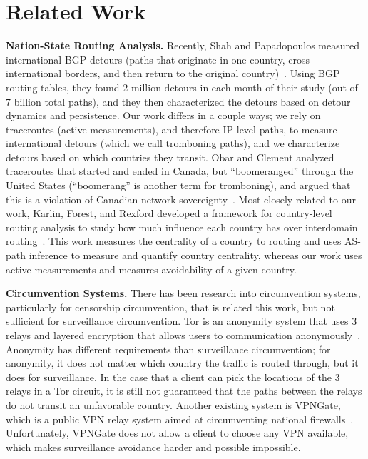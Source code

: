 \section{Related Work}
\label{related}

{\bf Nation-State Routing Analysis.}  Recently, Shah and Papadopoulos measured international BGP detours (paths that originate in one country, cross international borders, and then return to the original country)~\cite{shah2015characterizing}.  Using BGP routing tables, they found 2 million detours in each month of their study (out of 7 billion total paths), and they then characterized the detours based on detour dynamics and persistence.  Our work differs in a couple ways; we rely on traceroutes (active measurements), and therefore IP-level paths, to measure international detours (which we call tromboning paths), and we characterize detours based on which countries they transit.  Obar and Clement analyzed traceroutes that started and ended in Canada, but ``boomeranged'' through the United States (``boomerang'' is another term for tromboning), and argued that this is a violation of Canadian network sovereignty~\cite{obar2012internet}.  Most closely related to our work, Karlin, Forest, and Rexford developed a framework for country-level routing analysis to study how much influence each country has over interdomain routing~\cite{karlin2009nation}.  This work measures the centrality of a country to routing and uses AS-path inference to measure and quantify country centrality, whereas our work uses active measurements and measures avoidability of a given country.

{\bf Circumvention Systems.}  There has been research into circumvention systems, particularly for censorship circumvention, that is related this work, but not sufficient for surveillance circumvention.  Tor is an anonymity system that uses 3 relays and layered encryption that allows users to communication anonymously~\cite{dingledine2004tor}.  Anonymity has different requirements than surveillance circumvention; for anonymity, it does not matter which country the traffic is routed through, but it does for surveillance.  In the case that a client can pick the locations of the 3 relays in a Tor circuit, it is still not guaranteed that the paths between the relays do not transit an unfavorable country.  Another existing system is VPNGate, which is a public VPN relay system aimed at circumventing national firewalls~\cite{nobori2014vpn}.  Unfortunately, VPNGate does not allow a client to choose any VPN available, which makes surveillance avoidance harder and possible impossible.

